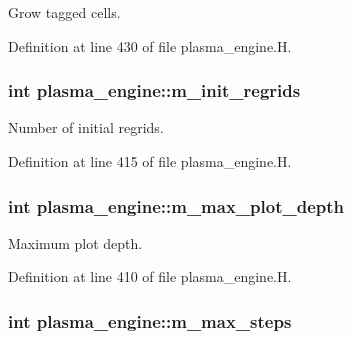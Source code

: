 Grow tagged cells. 



Definition at line 430 of file plasma\+\_\+engine.\+H.

\subsubsection[{\texorpdfstring{m\+\_\+init\+\_\+regrids}{m_init_regrids}}]{\setlength{\rightskip}{0pt plus 5cm}int plasma\+\_\+engine\+::m\+\_\+init\+\_\+regrids\hspace{0.3cm}{\ttfamily [protected]}}\hypertarget{classplasma__engine_abcf41488b5025036ef0ea7628c51335a}{}\label{classplasma__engine_abcf41488b5025036ef0ea7628c51335a}


Number of initial regrids. 



Definition at line 415 of file plasma\+\_\+engine.\+H.

\subsubsection[{\texorpdfstring{m\+\_\+max\+\_\+plot\+\_\+depth}{m_max_plot_depth}}]{\setlength{\rightskip}{0pt plus 5cm}int plasma\+\_\+engine\+::m\+\_\+max\+\_\+plot\+\_\+depth\hspace{0.3cm}{\ttfamily [protected]}}\hypertarget{classplasma__engine_ad3a3fcecf93110523dee8e00b517e801}{}\label{classplasma__engine_ad3a3fcecf93110523dee8e00b517e801}


Maximum plot depth. 



Definition at line 410 of file plasma\+\_\+engine.\+H.

\subsubsection[{\texorpdfstring{m\+\_\+max\+\_\+steps}{m_max_steps}}]{\setlength{\rightskip}{0pt plus 5cm}int plasma\+\_\+engine\+::m\+\_\+max\+\_\+steps\hspace{0.3cm}{\ttfamily [protected]}}\hypertarget{classplasma__engine_afaaa457cd8ff2b654a5331743b97d37c}{}\label{classplasma__engine_afaaa457cd8ff2b654a5331743b97d37c}


